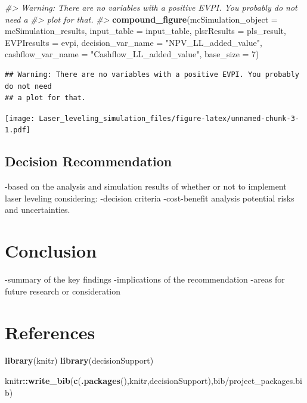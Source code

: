 \documentclass[
]{article}
\newenvironment{Shaded}{\begin{snugshade}}{\end{snugshade}}
\newcommand{\AttributeTok}[1]{\textcolor[rgb]{0.13,0.29,0.53}{#1}}
\newcommand{\CommentTok}[1]{\textcolor[rgb]{0.56,0.35,0.01}{\textit{#1}}}
\newcommand{\DecValTok}[1]{\textcolor[rgb]{0.00,0.00,0.81}{#1}}
\newcommand{\FunctionTok}[1]{\textcolor[rgb]{0.13,0.29,0.53}{\textbf{#1}}}
\newcommand{\NormalTok}[1]{#1}
\newcommand{\SpecialCharTok}[1]{\textcolor[rgb]{0.81,0.36,0.00}{\textbf{#1}}}
\newcommand{\StringTok}[1]{\textcolor[rgb]{0.31,0.60,0.02}{#1}}
\begin{document}
\begin{Shaded}
\begin{Highlighting}[]
\CommentTok{\#\textgreater{} Warning: There are no variables with a positive EVPI. You probably do not need a}
\CommentTok{\#\textgreater{} plot for that.}
\CommentTok{\#\textgreater{} }
\FunctionTok{compound\_figure}\NormalTok{(}\AttributeTok{mcSimulation\_object =}\NormalTok{ mcSimulation\_results, }\AttributeTok{input\_table =}\NormalTok{ input\_table, }\AttributeTok{plsrResults =}\NormalTok{ pls\_result, }\AttributeTok{EVPIresults =}\NormalTok{ evpi, }\AttributeTok{decision\_var\_name =} \StringTok{"NPV\_LL\_added\_value"}\NormalTok{, }\AttributeTok{cashflow\_var\_name =} \StringTok{"Cashflow\_LL\_added\_value"}\NormalTok{, }\AttributeTok{base\_size =} \DecValTok{7}\NormalTok{)}
\end{Highlighting}
\end{Shaded}

\begin{verbatim}
## Warning: There are no variables with a positive EVPI. You probably do not need
## a plot for that.
\end{verbatim}

\texttt{[image: Laser\_leveling\_simulation\_files/figure-latex/unnamed-chunk-3-1.pdf]}

\hypertarget{decision-recommendation}{%
\subsection{Decision Recommendation}\label{decision-recommendation}}

-based on the analysis and simulation results of whether or not to
implement laser leveling considering: -decision criteria -cost-benefit
analysis potential risks and uncertainties.

\hypertarget{conclusion}{%
\section{Conclusion}\label{conclusion}}

-summary of the key findings -implications of the recommendation -areas
for future research or consideration

\hypertarget{references}{%
\section{References}\label{references}}

\begin{Shaded}
\begin{Highlighting}[]
\FunctionTok{library}\NormalTok{(knitr)}
\FunctionTok{library}\NormalTok{(decisionSupport)}

\NormalTok{knitr}\SpecialCharTok{::}\FunctionTok{write\_bib}\NormalTok{(}\FunctionTok{c}\NormalTok{(}\FunctionTok{.packages}\NormalTok{(),}\StringTok{\textquotesingle{}knitr\textquotesingle{}}\NormalTok{,}\StringTok{\textquotesingle{}decisionSupport\textquotesingle{}}\NormalTok{),}\StringTok{\textquotesingle{}bib/project\_packages.bib\textquotesingle{}}\NormalTok{)}
\end{Highlighting}
\end{Shaded}
\end{document}

